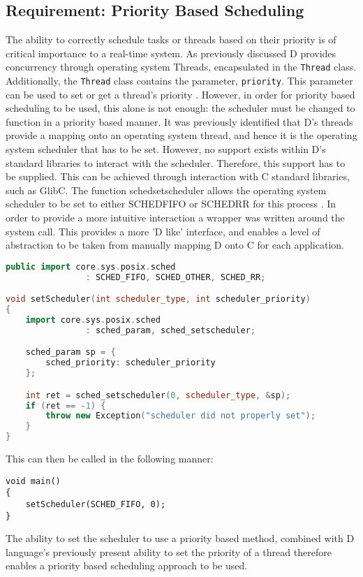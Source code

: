 \subsection{Requirement: Priority Based Scheduling}
The ability to correctly schedule tasks or threads based on their priority is of 
critical importance to a real-time system. As previously discussed D provides 
concurrency through operating system Threads, encapsulated in the
\texttt{Thread} class. Additionally, the \texttt{Thread} class contains the 
parameter, \texttt{priority}. This parameter can be used to set or get a thread's 
priority \cite{core-thread}. 
However, in order for priority based scheduling to be used, this alone is not 
enough: the scheduler must be changed to function in a priority based manner. 
It was previously identified that D's threads provide a mapping onto an operating  
system thread, and hence it is the operating system scheduler that has to be set.  
However, no support exists within D's standard libraries to interact with the
scheduler. 
Therefore, this support has to be supplied. 
This can be achieved through interaction with C standard libraries, such as GlibC. 
The function sched\textunderscore{}setscheduler allows the operating system 
scheduler to be set to either SCHED\textunderscore{}FIFO or SCHED\textunderscore{}RR for 
this process \cite{sched-setscheduler}. 
In order to provide a more intuitive interaction a wrapper was written around the 
system call. This provides a more 'D like' interface, and enables a level of
abstraction to be taken from manually mapping D onto C for each application. 
\begin{lstlisting}[language=C++]
public import core.sys.posix.sched 
                : SCHED_FIFO, SCHED_OTHER, SCHED_RR; 

void setScheduler(int scheduler_type, int scheduler_priority)
{
    import core.sys.posix.sched 
                : sched_param, sched_setscheduler; 

    sched_param sp = { 
        sched_priority: scheduler_priority 
    }; 

    int ret = sched_setscheduler(0, scheduler_type, &sp); 
    if (ret == -1) {
        throw new Exception("scheduler did not properly set");
    }
}
\end{lstlisting}
This can then be called in the following manner: 
\begin{lstlisting}
void main()
{
    setScheduler(SCHED_FIFO, 0); 
}
\end{lstlisting}
The ability to set the scheduler to use a priority based method, combined with 
D language's previously present ability to set the priority of a thread therefore 
enables a priority based scheduling approach to be used.  



